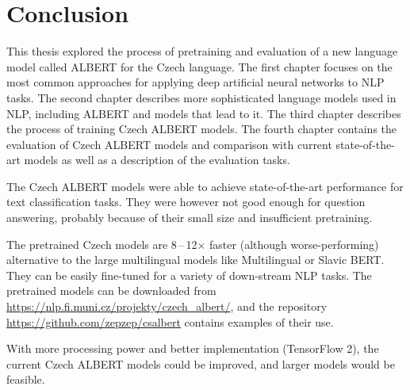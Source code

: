 \documentclass[
  printed, %
  color,   %
  table,   %
  oneside, %
  lof,     %
  lot,     %
]{fithesis3}
\begin{document}

\chapter*{Conclusion}

This thesis explored the process of pretraining and evaluation of a new language model called ALBERT for the Czech language. The first chapter focuses on the most common approaches for applying deep artificial neural networks to NLP tasks. The second chapter describes more sophisticated language models used in NLP, including ALBERT and models that lead to it. The third chapter describes the process of training Czech ALBERT models. The fourth chapter contains the evaluation of Czech ALBERT models and comparison with current state-of-the-art models as well as a description of the evaluation tasks.

The Czech ALBERT models were able to achieve state-of-the-art performance for text classification tasks. They were however not good enough for question answering, probably because of their small size and insufficient pretraining.

The pretrained Czech models are 8\,--\,12$\times$ faster (although worse-performing) alternative to the large multilingual models like Multilingual or Slavic BERT. They can be easily fine-tuned for a variety of down-stream NLP tasks. The pretrained models can be downloaded from \url{https://nlp.fi.muni.cz/projekty/czech_albert/}, and the repository \url{https://github.com/zepzep/csalbert} contains examples of their use.

With more processing power and better implementation (TensorFlow 2), the current Czech ALBERT models could be improved, and larger models would be feasible.



\end{document}
